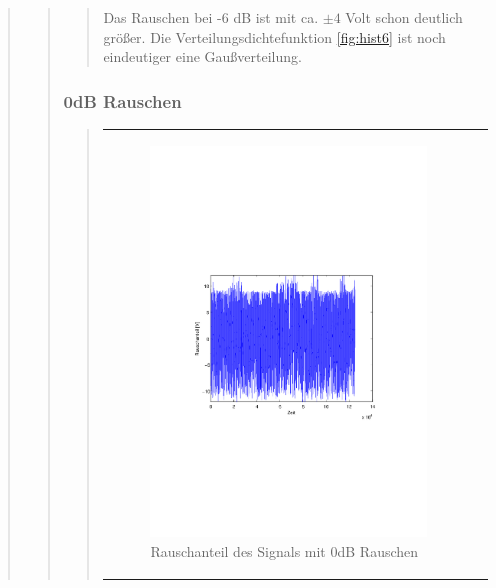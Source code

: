 \begin{quote}
\begin{quote}
\begin{quote}
            Das Rauschen bei -6 dB ist mit ca. $\pm 4$ Volt schon deutlich größer. Die Verteilungsdichtefunktion \ref{fig:hist6}
            ist noch eindeutiger eine Gaußverteilung.
            
            

        \end{quote}

        \subsubsection{0dB Rauschen}
        \begin{quote}
        \begin{center}
        \begin{tabular}{ll}
        
        \hspace{-16.5em}
            \begin{minipage}{0.6\textwidth}
                
                \begin{figure}[H]
                    \label{fig:funktion0alpha}
                    \includegraphics[scale=0.7, trim = 20mm 80mm 20mm 90mm, clip]{Bilder/rau0}
                    \caption{Rauschanteil des Signals mit 0dB Rauschen}
                \end{figure}
        

\end{minipage}
\end{tabular}
\end{center}
\end{quote}
\end{quote}
\end{quote}
